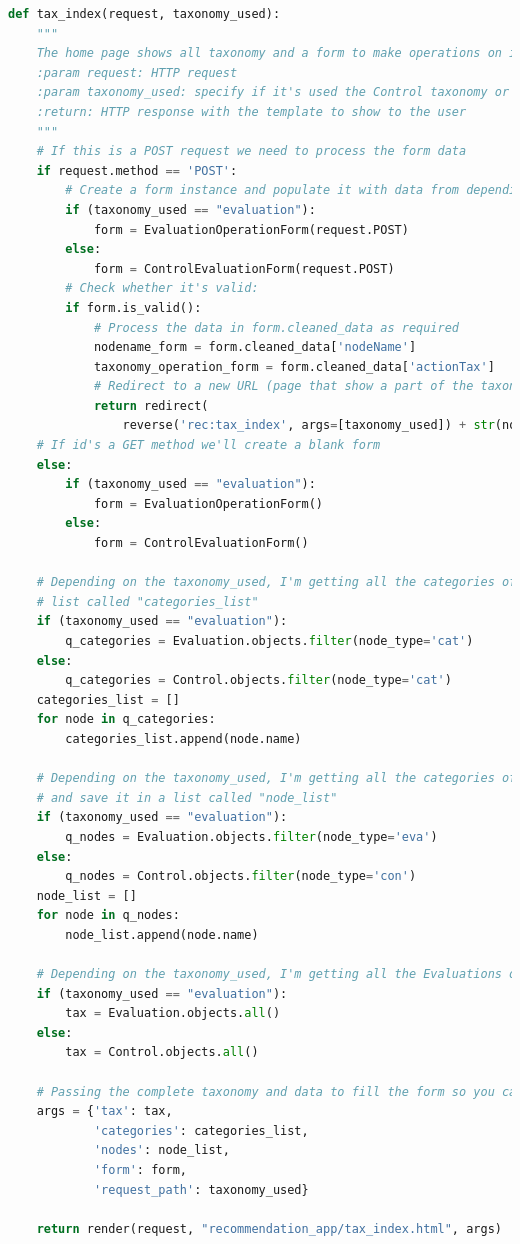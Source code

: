 \begin{lstlisting}[language=Python, label=lst:view_tax_homepage, caption={Home page dalla quale è possibile richiamare 
    diverse operazioni eseguibili sulla tassonomia.}]
def tax_index(request, taxonomy_used):
    """
    The home page shows all taxonomy and a form to make operations on it.
    :param request: HTTP request
    :param taxonomy_used: specify if it's used the Control taxonomy or the Evaluation taxonomy
    :return: HTTP response with the template to show to the user
    """
    # If this is a POST request we need to process the form data
    if request.method == 'POST':
        # Create a form instance and populate it with data from depending on the taxonomy_used
        if (taxonomy_used == "evaluation"):
            form = EvaluationOperationForm(request.POST)
        else:
            form = ControlEvaluationForm(request.POST)
        # Check whether it's valid:
        if form.is_valid():
            # Process the data in form.cleaned_data as required
            nodename_form = form.cleaned_data['nodeName']
            taxonomy_operation_form = form.cleaned_data['actionTax']
            # Redirect to a new URL (page that show a part of the taxonomy, depending on the action user has chosen):
            return redirect(
                reverse('rec:tax_index', args=[taxonomy_used]) + str(nodename_form) + '_' + taxonomy_operation_form)
    # If id's a GET method we'll create a blank form
    else:
        if (taxonomy_used == "evaluation"):
            form = EvaluationOperationForm()
        else:
            form = ControlEvaluationForm()
 
    # Depending on the taxonomy_used, I'm getting all the categories of Evaluations or Controls taxonomy and save it in a
    # list called "categories_list"
    if (taxonomy_used == "evaluation"):
        q_categories = Evaluation.objects.filter(node_type='cat')
    else:
        q_categories = Control.objects.filter(node_type='cat')
    categories_list = []
    for node in q_categories:
        categories_list.append(node.name)
 
    # Depending on the taxonomy_used, I'm getting all the categories of Evaluations or Controls node in the taxonomy
    # and save it in a list called "node_list"
    if (taxonomy_used == "evaluation"):
        q_nodes = Evaluation.objects.filter(node_type='eva')
    else:
        q_nodes = Control.objects.filter(node_type='con')
    node_list = []
    for node in q_nodes:
        node_list.append(node.name)
 
    # Depending on the taxonomy_used, I'm getting all the Evaluations or Controls taxonomy
    if (taxonomy_used == "evaluation"):
        tax = Evaluation.objects.all()
    else:
        tax = Control.objects.all()
 
    # Passing the complete taxonomy and data to fill the form so you can operate on the taxonomy
    args = {'tax': tax,
            'categories': categories_list,
            'nodes': node_list,
            'form': form,
            'request_path': taxonomy_used}
 
    return render(request, "recommendation_app/tax_index.html", args)
\end{lstlisting}
